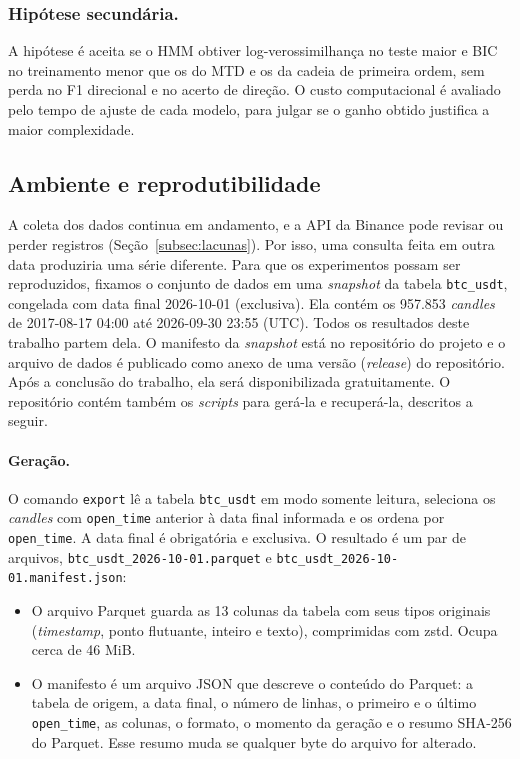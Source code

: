 \documentclass[
    12pt,                %
    openright,           %
    oneside,             %
    a4paper,             %
    english,             %
    brazil               %
]{abntex2}
\begin{document}
\subsubsection{Hipótese secundária.} A hipótese é aceita se o HMM obtiver log-verossimilhança no teste maior e BIC no treinamento menor que os do MTD e os da cadeia de primeira 
ordem, sem perda no F1 direcional e no acerto de direção. O custo computacional é avaliado pelo tempo de ajuste de cada modelo, para julgar se o ganho obtido justifica a maior complexidade.


\subsection{Ambiente e reprodutibilidade}
\label{subsec:ambiente}

A coleta dos dados continua em andamento, e a API da Binance pode revisar ou perder registros (Seção~\ref{subsec:lacunas}). Por isso,
uma consulta feita em outra data produziria uma série diferente. Para que os experimentos possam ser reproduzidos, fixamos o
conjunto de dados em uma \textit{snapshot} da tabela \texttt{btc\_usdt}, congelada com data final 2026-10-01 (exclusiva). Ela contém
os 957.853 \textit{candles} de 2017-08-17 04:00 até 2026-09-30 23:55 (UTC). Todos os resultados deste trabalho partem dela.
O manifesto da \textit{snapshot} está no repositório do projeto e o arquivo de dados é publicado como anexo de uma versão (\textit{release})
do repositório. Após a conclusão do trabalho, ela será disponibilizada gratuitamente. O repositório contém também os \textit{scripts}
para gerá-la e recuperá-la, descritos a seguir.

\paragraph{Geração.} O comando \texttt{export} lê a tabela \texttt{btc\_usdt} em modo somente leitura, seleciona os \textit{candles} com
\texttt{open\_time} anterior à data final informada e os ordena por \texttt{open\_time}. A data final é obrigatória e exclusiva. 
O resultado é um par de arquivos, \texttt{btc\_usdt\_2026-10-01.parquet} e \texttt{btc\_usdt\_2026-10-01.manifest.json}:

\begin{itemize}
  \item O arquivo Parquet guarda as 13 colunas da tabela com seus tipos originais (\textit{timestamp}, ponto flutuante, inteiro e texto), comprimidas
  com zstd. Ocupa cerca de 46 MiB.
  \item O manifesto é um arquivo JSON que descreve o conteúdo do Parquet: a tabela de origem, a data final, o número de linhas, o primeiro e o
  último \texttt{open\_time}, as colunas, o formato, o momento da geração e o resumo SHA-256 do Parquet. Esse resumo muda se qualquer byte do
  arquivo for alterado.
\end{itemize}
\end{document}
